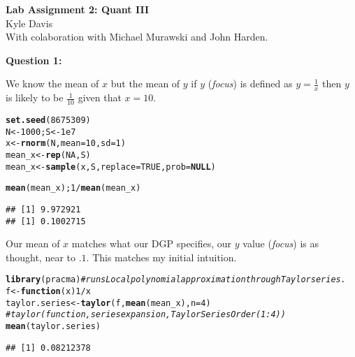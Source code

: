 \documentclass[12pt]{article}\usepackage[]{graphicx}\usepackage[]{color}
\makeatletter
\newcommand{\hlnum}[1]{\textcolor[rgb]{0.686,0.059,0.569}{#1}}%
\newcommand{\hlcom}[1]{\textcolor[rgb]{0.678,0.584,0.686}{\textit{#1}}}%
\newcommand{\hlopt}[1]{\textcolor[rgb]{0,0,0}{#1}}%
\newcommand{\hlstd}[1]{\textcolor[rgb]{0.345,0.345,0.345}{#1}}%
\newcommand{\hlkwa}[1]{\textcolor[rgb]{0.161,0.373,0.58}{\textbf{#1}}}%
\newcommand{\hlkwb}[1]{\textcolor[rgb]{0.69,0.353,0.396}{#1}}%
\newcommand{\hlkwc}[1]{\textcolor[rgb]{0.333,0.667,0.333}{#1}}%
\newcommand{\hlkwd}[1]{\textcolor[rgb]{0.737,0.353,0.396}{\textbf{#1}}}%
\newenvironment{kframe}{%
 \def\at@end@of@kframe{}%
 \ifinner\ifhmode%
  \def\at@end@of@kframe{\end{minipage}}%
  \begin{minipage}{\columnwidth}%
 \fi\fi%
 \def\FrameCommand##1{\hskip\@totalleftmargin \hskip-\fboxsep
 \colorbox{shadecolor}{##1}\hskip-\fboxsep
     \hskip-\linewidth \hskip-\@totalleftmargin \hskip\columnwidth}%
 \MakeFramed {\advance\hsize-\width
   \@totalleftmargin\z@ \linewidth\hsize
   \@setminipage}}%
 {\par\unskip\endMakeFramed%
 \at@end@of@kframe}
\newenvironment{knitrout}{}{} %
\makeatother
\begin{document}
\begin{center}
\textbf{Lab Assignment 2: Quant III}\\
Kyle Davis\\
With colaboration with Michael Murawski and John Harden.

\end{center}
\begin{flushleft}

\noindent \textbf{Question 1:}

We know the mean of $x$ but the mean of $y$ if $y$ (\textit{focus}) is defined as $y = \frac{1}{x}$ then $y$ is likely to be $\frac{1}{10}$ given that $x=10$. 

\begin{knitrout}
\color{fgcolor}\begin{kframe}
\begin{alltt}
\hlkwd{set.seed}\hlstd{(}\hlnum{8675309}\hlstd{)}
\hlstd{N} \hlkwb{<-} \hlnum{1000}\hlstd{; S} \hlkwb{<-} \hlnum{1e7}
\hlstd{x} \hlkwb{<-} \hlkwd{rnorm}\hlstd{(N,} \hlkwc{mean}\hlstd{=}\hlnum{10}\hlstd{,} \hlkwc{sd}\hlstd{=}\hlnum{1}\hlstd{)}
\hlstd{mean_x} \hlkwb{<-} \hlkwd{rep}\hlstd{(}\hlnum{NA}\hlstd{, S)}
\hlstd{mean_x} \hlkwb{<-} \hlkwd{sample}\hlstd{(x, S,} \hlkwc{replace}\hlstd{=}\hlnum{TRUE}\hlstd{,} \hlkwc{prob} \hlstd{=} \hlkwa{NULL}\hlstd{)}

\hlkwd{mean}\hlstd{(mean_x);} \hlnum{1}\hlopt{/}\hlkwd{mean}\hlstd{(mean_x)}
\end{alltt}
\begin{verbatim}
## [1] 9.972921
## [1] 0.1002715
\end{verbatim}
\end{kframe}
\end{knitrout}

Our mean of $x$ matches what our DGP specifies, our $y$ value (\textit{focus}) is as thought, near to $.1$. This matches my initial intuition. 

\begin{knitrout}
\color{fgcolor}\begin{kframe}
\begin{alltt}
\hlkwd{library}\hlstd{(pracma)} \hlcom{#runs Local polynomial approximation through Taylor series.}
\hlstd{f} \hlkwb{<-} \hlkwa{function}\hlstd{(}\hlkwc{x}\hlstd{)} \hlnum{1}\hlopt{/}\hlstd{x}
\hlstd{taylor.series} \hlkwb{<-} \hlkwd{taylor}\hlstd{(f,} \hlkwd{mean}\hlstd{(mean_x),} \hlkwc{n} \hlstd{=} \hlnum{4}\hlstd{)}
      \hlcom{#taylor(function, series expansion, Taylor Series Order (1:4))}
\hlkwd{mean}\hlstd{(taylor.series)}
\end{alltt}
\begin{verbatim}
## [1] 0.08212378
\end{verbatim}
\end{kframe}
\end{knitrout}



\end{flushleft}
\end{document}
